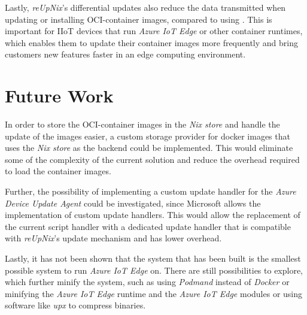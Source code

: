 Lastly, \textit{reUpNix}'s differential updates also reduce the data transmitted
when updating or installing \ac{OCI}-container images, compared to using .
This is important for \ac{IIoT} devices that run \textit{Azure IoT Edge} or other
container runtimes, which enables them to update their container images more frequently
and bring customers new features faster in an edge computing environment.


\section{Future Work}
In order to store the \ac{OCI}-container images in the \textit{Nix store} and
handle the update of the images easier, a custom storage provider for docker images 
that uses the \textit{Nix store} as the backend could be implemented.
This would eliminate some of the complexity of the current solution and reduce
the overhead required to load the container images.

Further, the possibility of implementing a custom update handler for 
the \textit{Azure Device Update Agent} could be investigated, since Microsoft allows
the implementation of custom update handlers. This would allow the replacement of the
current script handler with a dedicated update handler that is compatible
with \textit{reUpNix}'s update mechanism and has lower overhead.

Lastly, it has not been shown that the system that has been built is the smallest possible
system to run \textit{Azure IoT Edge} on. There are still possibilities to explore, which
further minify the system, such as using \textit{Podmand} instead of \textit{Docker}
or minifying the \textit{Azure IoT Edge} runtime and the \textit{Azure IoT Edge} modules
or using software like \textit{upx} to compress binaries.
